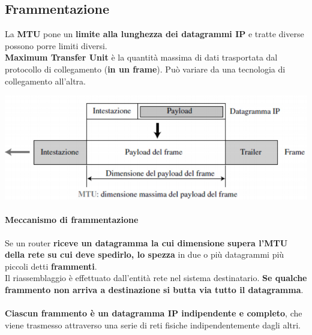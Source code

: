 \documentclass[10pt]{article}
\begin{document}
\subsection{Frammentazione}
La \textbf{MTU} pone un \textbf{limite alla lunghezza dei datagrammi IP} e tratte diverse possono porre limiti diversi.\\
\textbf{Maximum Transfer Unit} è la quantità massima di dati trasportata dal protocollo di collegamento (\textbf{in un frame}). Può variare da una tecnologia di collegamento all'altra.
\begin{center}
\includegraphics[scale=0.7]{ipmtu.png}
\end{center}
\paragraph{Meccanismo di frammentazione} Se un router \textbf{riceve un datagramma la cui dimensione supera l'MTU della rete su cui deve spedirlo, lo spezza} in due o più datagrammi più piccoli detti \textbf{frammenti}.\\
Il riassemblaggio è effettuato dall'entità rete nel sistema destinatario. \textbf{Se qualche frammento non arriva a destinazione si butta via tutto il datagramma}.\\\\
\textbf{Ciascun frammento è un datagramma IP indipendente e completo}, che viene trasmesso attraverso una serie di reti fisiche indipendentemente dagli altri.
\pagebreak
\end{document}
